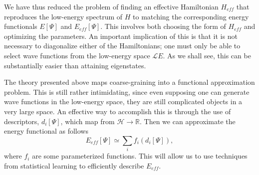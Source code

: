 
We have thus reduced the problem of finding an effective Hamiltonian $H_{eff}$ that reproduces the low-energy spectrum of $H$ to matching the corresponding energy functionals $E[\Psi]$ and $E_{eff}[\Psi]$. 
This involves both choosing the form of $H_{eff}$ and optimizing the parameters.
An important implication of this is that it is not necessary to diagonalize either of the Hamiltonians; one must only be able to select wave functions from the low-energy space ${\mathcal LE}$.
As we shall see, this can be substantially easier than attaining eigenstates.


The theory presented above maps coarse-graining into a functional approximation problem. 
This is still rather intimidating, since even supposing one can generate wave functions in the low-energy space, they are still complicated objects in a very large space.
An effective way to accomplish this is through the use of descriptors, $d_i[\Psi]$, which map from ${\mathcal H} \rightarrow \mathbb{R}$.
Then we can approximate the energy functional as follows
\begin{equation}
E_{eff}[\Psi] \simeq \sum_i f_i(d_i[\Psi]),
\end{equation}
where $f_i$ are some parameterized functions.
This will allow us to use techniques from statistical learning to efficiently describe $E_{eff}$. 
